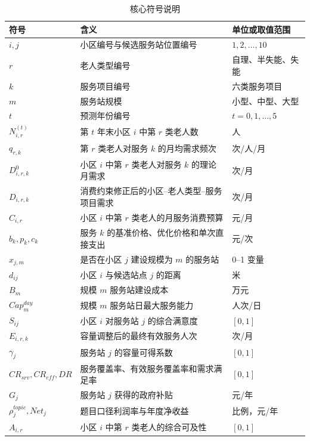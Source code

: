 \begin{table}[H]
  \centering
  \caption{核心符号说明}
  \label{tab:symbols-core}
  \footnotesize
  \renewcommand{\arraystretch}{1.05}
  \begin{tabular}{p{}p{}p{}}
    \toprule
    符号 & 含义 & 单位或取值范围 \\
    \midrule
    $i,j$ & 小区编号与候选服务站位置编号 & $1,2,\ldots,10$ \\
    $r$ & 老人类型编号 & 自理、半失能、失能 \\
    $k$ & 服务项目编号 & 六类服务项目 \\
    $m$ & 服务站规模 & 小型、中型、大型 \\
    $t$ & 预测年份编号 & $t=0,1,\ldots,5$ \\
    $N_{i,r}^{(t)}$ & 第 $t$ 年末小区 $i$ 中第 $r$ 类老人数 & 人 \\
    $q_{r,k}$ & 第 $r$ 类老人对服务 $k$ 的月均需求频次 & 次/人/月 \\
    $D_{i,r,k}^{0}$ & 小区 $i$ 中第 $r$ 类老人对服务 $k$ 的理论月需求 & 次/月 \\
    $D_{i,r,k}$ & 消费约束修正后的小区--老人类型--服务项目需求 & 次/月 \\
    $C_{i,r}$ & 小区 $i$ 中第 $r$ 类老人的月服务消费预算 & 元/月 \\
    $b_k,p_k,c_k$ & 服务 $k$ 的基准价格、优化价格和单次直接支出 & 元/次 \\
    $x_{j,m}$ & 是否在小区 $j$ 建设规模为 $m$ 的服务站 & 0--1 变量 \\
    $d_{ij}$ & 小区 $i$ 与候选站点 $j$ 的距离 & 米 \\
    $B_m$ & 规模 $m$ 服务站建设成本 & 万元 \\
    $Cap_m^{day}$ & 规模 $m$ 服务站日最大服务能力 & 人次/日 \\
    $S_{ij}$ & 小区 $i$ 对服务站 $j$ 的综合满意度 & $[0,1]$ \\
    $E_{i,r,k}$ & 容量调整后的最终有效服务人次 & 次/月 \\
    $\gamma_j$ & 服务站 $j$ 的容量可得系数 & $[0,1]$ \\
    $CR_{srv},CR_{eff},DR$ & 服务覆盖率、有效服务覆盖率和需求满足率 & $[0,1]$ \\
    $G_j$ & 服务站 $j$ 获得的政府补贴 & 元/年 \\
    $\rho_j^{topic},Net_j$ & 题目口径利润率与年度净收益 & 比例，元/年 \\
    $A_{i,r}$ & 小区 $i$ 中第 $r$ 类老人的综合可及性 & $[0,1]$ \\
    \bottomrule
  \end{tabular}
\end{table}

